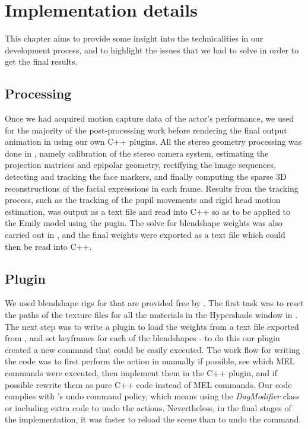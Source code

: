 \chapter{Implementation details}
\label{ch:implementation_details}

This chapter aims to provide some insight into the technicalities in our development process, and to highlight the issues that we had to solve in order to get the final results. 

\section{\Matlab Processing}

Once we had acquired motion capture data of the actor's performance, we used \Matlab for the majority of the post-processing work before rendering the final output animation in \Maya using our own C++ plugins. All the stereo geometry processing was done in \Matlab, namely calibration of the stereo camera system, estimating the projection matrices and epipolar geometry, rectifying the image sequences, detecting and tracking the face markers, and finally computing the sparse 3D reconstructions of the facial expressions in each frame. Results from the tracking process, such as the tracking of the pupil movements and rigid head motion estimation, was output as a text file and read into C++ so as to be applied to the Emily model using the \Maya pugin. The solve for blendshape weights was also carried out in \Matlab, and the final weights were exported as a text file which could then be read into C++. 

\section{\Maya Plugin}
\label{sec:maya_plugin}

We used blendshape rigs for \Maya that are provided free by \cite{FaceWareRigsWeb}. The first task was to reset the paths of the texture files for all the materials in the Hypershade window in \Maya.
The next step was to write a plugin to load the weights from a text file exported from \Matlab, and set keyframes for each of the blendshapes - to do this our plugin created a new \Maya command that could be easily executed. 
The work flow for writing the code was to first perform the action in \Maya manually if possible, see which MEL commands were executed, then implement them in the C++ plugin, and if possible rewrite them as pure C++ code instead of MEL commands.
Our code complies with \Maya's undo command policy, which means using the \emph{DagModifier} class or including extra code to undo the actions.
Nevertheless, in the final stages of the implementation, it was faster to reload the scene than to undo the command.

